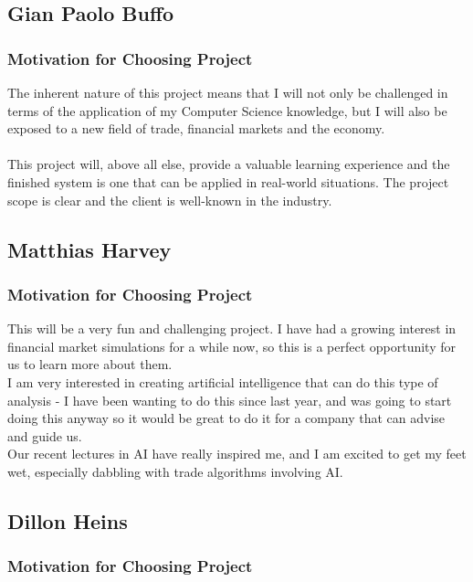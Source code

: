 \documentclass{article}
\begin{document}
	\cleardoublepage		
		
	\subsection{Gian Paolo Buffo}
		
		\subsubsection{Motivation for Choosing Project}
		The inherent nature of this project means that I will not only be challenged in terms of the application of my Computer Science knowledge, but I will also be exposed to a new field of trade, financial markets and the economy.
\\\\
This project will, above all else, provide a valuable learning experience and the finished system is one that can be applied in real-world situations. The project scope is clear and the client is well-known in the industry. 

	\cleardoublepage

	\subsection{Matthias Harvey}
		
		\subsubsection{Motivation for Choosing Project}
		This will be a very fun and challenging project. I have had a growing interest in financial market simulations for a while now, so this is a perfect opportunity for us to learn more about them.\\
		
		I am very interested in creating artificial intelligence that can do this type of analysis - I have been wanting to do this since last year, and was going to start doing this anyway so it would be great to do it for a company that can advise and guide us.\\

		Our recent lectures in AI have really inspired me, and I am excited to get my feet wet, especially dabbling with trade algorithms involving AI.
	\cleardoublepage
	
	\subsection{Dillon Heins}
		\subsubsection{Motivation for Choosing Project}
\end{document}
